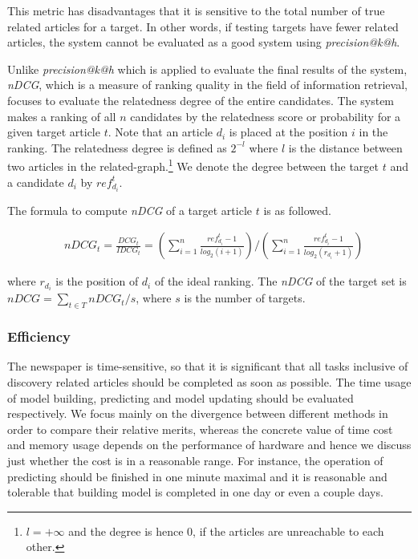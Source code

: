 This metric has disadvantages that it is sensitive to the total number of true related articles for a target. In other words, if testing targets have fewer related articles, the system cannot be evaluated as a good system using \textit{precision@k@h}. 

Unlike \textit{precision@k@h} which is applied to evaluate the final results of the system, \textit{nDCG}, which is a measure of ranking quality in the field of information retrieval, focuses to evaluate the relatedness degree of the entire candidates. The system makes a ranking of all $n$ candidates by the relatedness score or probability for a given target article $t$. Note that an article $d_i$ is placed at the position $i$ in the ranking. The relatedness degree is defined as $2^{-l}$ where $l$ is the distance between two articles in the related-graph.\footnote{$l=+\infty$ and the degree is hence $0$, if the articles are unreachable to each other.} We denote the degree between the target $t$ and a candidate $d_i$ by $ref_{d_i}^t$.

The formula to compute \textit{nDCG} of a target article $t$ is as followed. 

\begin{align}
   & nDCG_t = \frac{DCG_t}{IDCG_t} = (\sum_{i=1}^n\frac{ref_{d_i}^t-1}{log_2(i+1)})/(\sum_{i=1}^n\frac{ref_{d_i}^t-1}{log_2(r_{d_i}+1)})
\end{align}

where $r_{d_i}$ is the position of $d_i$ of the ideal ranking. The \textit{nDCG} of the target set is $nDCG = \sum_{t \in T}nDCG_t/s$, where $s$ is the number of targets.

\subsubsection{Efficiency}

The newspaper is time-sensitive, so that it is significant that all tasks inclusive of discovery related articles should be completed as soon as possible. The time usage of model building, predicting and model updating should be evaluated respectively. We focus mainly on the divergence between different methods in order to compare their relative merits, whereas the concrete value of time cost and memory usage depends on the performance of hardware and hence we discuss just whether the cost is in a reasonable range. For instance, the operation of predicting should be finished in one minute maximal and it is reasonable and tolerable that building model is completed in one day or even a couple days. 
